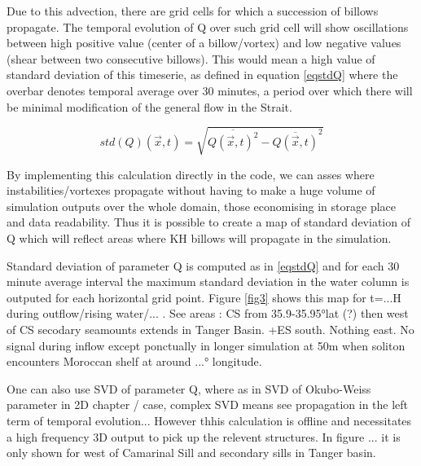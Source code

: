 Due to this advection, there are grid cells for which a succession of billows propagate. The temporal evolution of Q over such grid cell will show oscillations between high positive value (center of a billow/vortex) and low negative values (shear between two consecutive billows). This would mean a high value of standard deviation of this timeserie, as defined in equation \ref{eqstdQ} where the overbar denotes temporal average over 30 minutes, a period over which there will be minimal modification of the general flow in the Strait.

\begin{equation} 
\label{eqstdQ} 
    std ( Q ) (\vec{x},t)=  \sqrt{   \overline{Q (\vec{x},t)^{2}} -  \overline{Q(\vec{x},t)}^{2}       }
\end{equation}

By implementing this calculation directly in the code, we can asses where instabilities/vortexes propagate without having to make a huge volume of simulation outputs over the whole domain, those economising in storage place and data readability. Thus it is possible to create a map of standard deviation of Q which will reflect areas where KH billows will propagate in the simulation.

Standard deviation of parameter Q is computed as in \ref{eqstdQ} and for each 30 minute average interval the maximum standard deviation in the water column is outputed for each horizontal grid point. Figure \ref{fig3} shows this map for t=...H during outflow/rising water/... . See areas : CS from 35.9-35.95°lat (?) then west of CS secodary seamounts extends in Tanger Basin. +ES south. Nothing east. No signal during inflow except ponctually in longer simulation at 50m when soliton encounters Moroccan shelf at around ...° longitude.


One can also use SVD of parameter Q, where as in SVD of Okubo-Weiss parameter in 2D chapter / case, complex SVD means see propagation in the left  term of temporal evolution... However thhis calculation is offline and necessitates a high frequency 3D output to pick up the relevent structures. In figure ... it is only shown for west of Camarinal Sill and secondary sills in Tanger basin.


